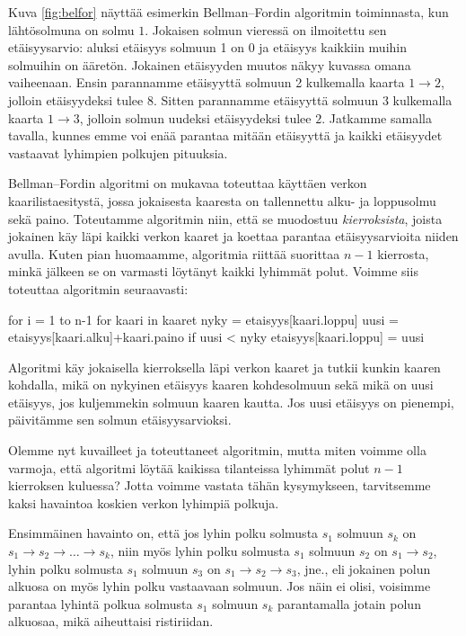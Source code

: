 Kuva \ref{fig:belfor} näyttää esimerkin Bellman–Fordin algoritmin toiminnasta,
kun lähtösolmuna on solmu $1$.
Jokaisen solmun vieressä on ilmoitettu sen etäisyysarvio:
aluksi etäisyys solmuun 1 on 0 ja etäisyys kaikkiin muihin solmuihin on ääretön.
Jokainen etäisyyden muutos näkyy kuvassa omana vaiheenaan.
Ensin parannamme etäisyyttä solmuun 2
kulkemalla kaarta $1 \rightarrow 2$,
jolloin etäisyydeksi tulee $8$.
Sitten parannamme etäisyyttä solmuun $3$
kulkemalla kaarta $1 \rightarrow 3$,
jolloin solmun uudeksi etäisyydeksi tulee $2$.
Jatkamme samalla tavalla, kunnes emme voi enää parantaa
mitään etäisyyttä ja kaikki etäisyydet
vastaavat lyhimpien polkujen pituuksia.

Bellman–Fordin algoritmi on mukavaa toteuttaa
käyttäen verkon kaarilistaesitystä,
jossa jokaisesta kaaresta on tallennettu alku- ja loppusolmu sekä paino.
Toteutamme algoritmin niin,
että se muodostuu \emph{kierroksista},
joista jokainen käy läpi kaikki verkon kaaret
ja koettaa parantaa etäisyysarvioita niiden avulla.
Kuten pian huomaamme, algoritmia riittää suorittaa $n-1$
kierrosta, minkä jälkeen se on varmasti löytänyt
kaikki lyhimmät polut. Voimme siis toteuttaa algoritmin seuraavasti:

\begin{code}
for i = 1 to n-1
    for kaari in kaaret
        nyky = etaisyys[kaari.loppu]
        uusi = etaisyys[kaari.alku]+kaari.paino
        if uusi < nyky
            etaisyys[kaari.loppu] = uusi
\end{code}

Algoritmi käy jokaisella kierroksella läpi verkon kaaret
ja tutkii kunkin kaaren kohdalla,
mikä on nykyinen etäisyys kaaren kohdesolmuun
sekä mikä on uusi etäisyys, jos kuljemmekin solmuun kaaren kautta.
Jos uusi etäisyys on pienempi, päivitämme
sen solmun etäisyysarvioksi.

Olemme nyt kuvailleet ja toteuttaneet algoritmin,
mutta miten voimme olla varmoja,
että algoritmi löytää kaikissa tilanteissa lyhimmät polut $n-1$ kierroksen kuluessa?
Jotta voimme vastata tähän kysymykseen,
tarvitsemme kaksi havaintoa koskien verkon lyhimpiä polkuja.

Ensimmäinen havainto on, että jos lyhin polku solmusta $s_1$ solmuun $s_k$ on
$s_1 \rightarrow s_2 \rightarrow \dots \rightarrow s_k$,
niin myös lyhin polku solmusta $s_1$ solmuun $s_2$ on $s_1 \rightarrow s_2$,
lyhin polku solmusta $s_1$ solmuun $s_3$ on $s_1 \rightarrow s_2 \rightarrow s_3$, jne.,
eli jokainen polun alkuosa on myös lyhin polku vastaavaan solmuun.
Jos näin ei olisi, voisimme parantaa lyhintä polkua solmusta $s_1$ solmuun $s_k$
parantamalla jotain polun alkuosaa, mikä aiheuttaisi ristiriidan.


